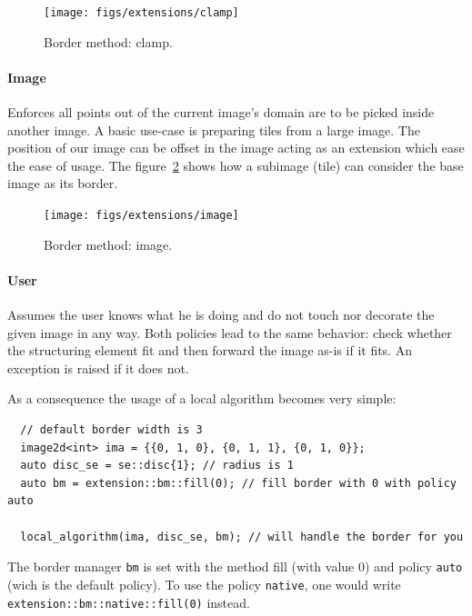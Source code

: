 \begin{figure}[tbh]
  \centering
  \texttt{[image: figs/extensions/clamp]}
  \caption{Border method: clamp.}
  \label{fig:border.clamp}
\end{figure}

\paragraph{Image} Enforces all points out of the current image's domain are to be picked inside another image. A basic
use-case is preparing tiles from a large image. The position of our image can be offset in the image acting as an
extension which ease the ease of usage. The figure~\ref{fig:border.image} shows how a subimage (tile) can consider the
base image as its border.

\begin{figure}[tbh]
  \centering
  \texttt{[image: figs/extensions/image]}
  \caption{Border method: image.}
  \label{fig:border.image}
\end{figure}


\paragraph{User} Assumes the user knows what he is doing and do not touch nor decorate the given image in any way. Both
policies lead to the same behavior: check whether the structuring element fit and then forward the image as-is if it
fits. An exception is raised if it does not.

As a consequence the usage of a local algorithm becomes very simple:

\begin{verbatim}
  // default border width is 3
  image2d<int> ima = {{0, 1, 0}, {0, 1, 1}, {0, 1, 0}};
  auto disc_se = se::disc{1}; // radius is 1
  auto bm = extension::bm::fill(0); // fill border with 0 with policy auto

  local_algorithm(ima, disc_se, bm); // will handle the border for you
\end{verbatim}

The border manager \texttt{bm} is set with the method fill (with value 0) and policy \texttt{auto} (wich is the default
policy). To use the policy \texttt{native}, one would write \texttt{extension::bm::native::fill(0)} instead.

